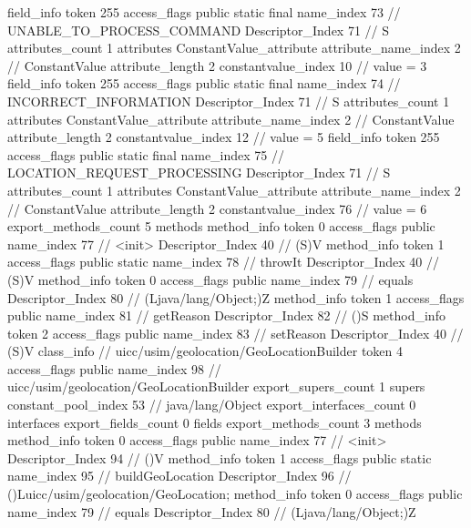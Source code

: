 {{{{{{{				}
				}
			}
			field_info {
				token	255
				access_flags	public static final
				name_index	73		// UNABLE_TO_PROCESS_COMMAND
				Descriptor_Index	71		// S
				attributes_count	1
				attributes {
				ConstantValue_attribute {
					attribute_name_index	2		// ConstantValue
					attribute_length	2
					constantvalue_index	10		// value = 3
				}
				}
			}
			field_info {
				token	255
				access_flags	public static final
				name_index	74		// INCORRECT_INFORMATION
				Descriptor_Index	71		// S
				attributes_count	1
				attributes {
				ConstantValue_attribute {
					attribute_name_index	2		// ConstantValue
					attribute_length	2
					constantvalue_index	12		// value = 5
				}
				}
			}
			field_info {
				token	255
				access_flags	public static final
				name_index	75		// LOCATION_REQUEST_PROCESSING
				Descriptor_Index	71		// S
				attributes_count	1
				attributes {
				ConstantValue_attribute {
					attribute_name_index	2		// ConstantValue
					attribute_length	2
					constantvalue_index	76		// value = 6
				}
				}
			}
			}
			export_methods_count	5
			methods {
				method_info {
					token	0
					access_flags	public
					name_index	77		// <init>
					Descriptor_Index	40		// (S)V
				}
				method_info {
					token	1
					access_flags	public static
					name_index	78		// throwIt
					Descriptor_Index	40		// (S)V
				}
				method_info {
					token	0
					access_flags	public
					name_index	79		// equals
					Descriptor_Index	80		// (Ljava/lang/Object;)Z
				}
				method_info {
					token	1
					access_flags	public
					name_index	81		// getReason
					Descriptor_Index	82		// ()S
				}
				method_info {
					token	2
					access_flags	public
					name_index	83		// setReason
					Descriptor_Index	40		// (S)V
				}
			}
		}
		class_info {		// uicc/usim/geolocation/GeoLocationBuilder
			token	4
			access_flags	public
			name_index	98		// uicc/usim/geolocation/GeoLocationBuilder
			export_supers_count	1
			supers {
				constant_pool_index	53		// java/lang/Object
			}
			export_interfaces_count	0
			interfaces {
			}
			export_fields_count	0
			fields {
			}
			export_methods_count	3
			methods {
				method_info {
					token	0
					access_flags	public
					name_index	77		// <init>
					Descriptor_Index	94		// ()V
				}
				method_info {
					token	1
					access_flags	public static
					name_index	95		// buildGeoLocation
					Descriptor_Index	96		// ()Luicc/usim/geolocation/GeoLocation;
				}
				method_info {
					token	0
					access_flags	public
					name_index	79		// equals
					Descriptor_Index	80		// (Ljava/lang/Object;)Z
				}
			}
		}
	}
}
